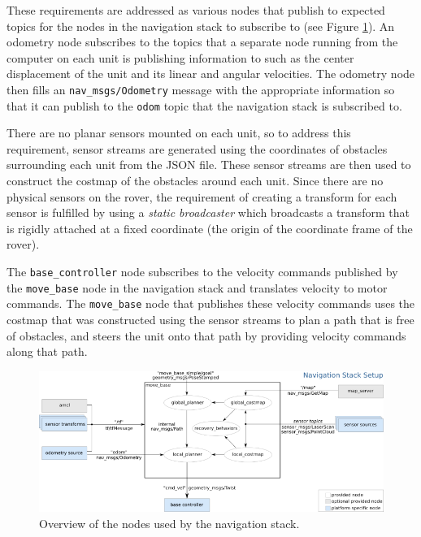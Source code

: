 \documentclass{article}
\begin{document}
          These requirements are addressed as various nodes that publish to expected topics for the nodes in the navigation stack to subscribe to (see Figure \ref{fig:nav-stack-overview}). An odometry node subscribes to the topics that a separate node running from the computer on each unit is publishing information to such as the center displacement of the unit and its linear and angular velocities. The odometry node then fills an \verb|nav_msgs/Odometry| message with the appropriate information so that it can publish to the \verb|odom| topic that the navigation stack is subscribed to.
          \par There are no planar sensors mounted on each unit, so to address this requirement, sensor streams are generated using the coordinates of obstacles surrounding each unit from the JSON file. These sensor streams are then used to construct the costmap of the obstacles around each unit. Since there are no physical sensors on the rover, the requirement of creating a transform for each sensor is fulfilled by using a \textit{static broadcaster} which broadcasts a transform that is rigidly attached at a fixed coordinate (the origin of the coordinate frame of the rover).
          \par The \verb|base_controller| node subscribes to the velocity commands published by the \verb|move_base| node in the navigation stack and translates velocity to motor commands. The \verb|move_base| node that publishes these velocity commands uses the costmap that was constructed using the sensor streams to plan a path that is free of obstacles, and steers the unit onto that path by providing velocity commands along that path.
          \begin{figure}[h]
               \centering
               \includegraphics[scale=0.5]{images/nav_stack_overview}
               \caption[Overview of the Navigation Stack Setup]{Overview of the nodes used by the navigation stack.}
               \label{fig:nav-stack-overview}
          \end{figure}
\end{document}
